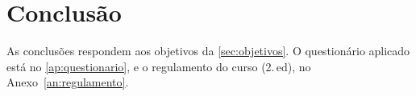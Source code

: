 \chapter{Conclusão}\label{cap:conclusao}

As conclusões respondem aos objetivos da \autoref{sec:objetivos}. O
questionário aplicado está no \autoref{ap:questionario}, e o regulamento
do curso (2.\,\acs{ed}), no Anexo~\ref{an:regulamento}.
